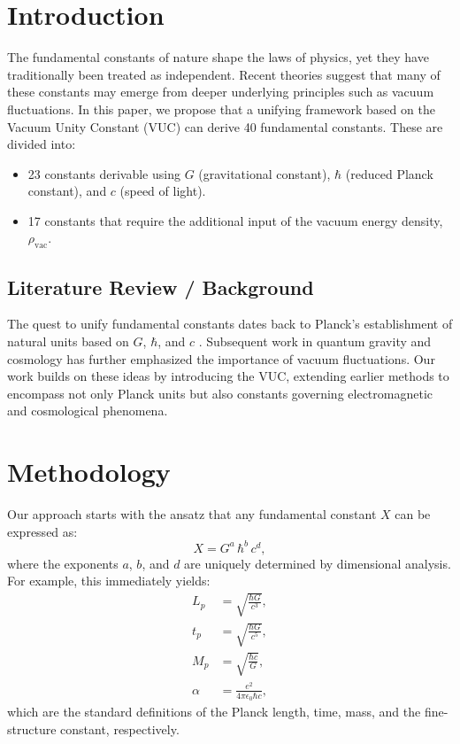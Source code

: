 \documentclass[12pt]{article}
\begin{document}
\section{Introduction}
The fundamental constants of nature shape the laws of physics, yet they have traditionally been treated as independent. Recent theories suggest that many of these constants may emerge from deeper underlying principles such as vacuum fluctuations. In this paper, we propose that a unifying framework based on the Vacuum Unity Constant (VUC) can derive 40 fundamental constants. These are divided into:
\begin{itemize}
    \item 23 constants derivable using \(G\) (gravitational constant), \(\hbar\) (reduced Planck constant), and \(c\) (speed of light).
    \item 17 constants that require the additional input of the vacuum energy density, \(\rho_{\text{vac}}\).
\end{itemize}

\subsection*{Literature Review / Background}
The quest to unify fundamental constants dates back to Planck's establishment of natural units based on \(G\), \(\hbar\), and \(c\) \cite{Planck1900}. Subsequent work in quantum gravity and cosmology \cite{Rovelli1998,Smolin2001} has further emphasized the importance of vacuum fluctuations. Our work builds on these ideas by introducing the VUC, extending earlier methods to encompass not only Planck units but also constants governing electromagnetic and cosmological phenomena.

\section{Methodology}
Our approach starts with the ansatz that any fundamental constant \(X\) can be expressed as:
\[
X = G^a\, \hbar^b\, c^d,
\]
where the exponents \(a\), \(b\), and \(d\) are uniquely determined by dimensional analysis. For example, this immediately yields:
\begin{align}
    L_p &= \sqrt{\frac{\hbar G}{c^3}}, \label{eq:planck_length}\\[1mm]
    t_p &= \sqrt{\frac{\hbar G}{c^5}}, \label{eq:planck_time}\\[1mm]
    M_p &= \sqrt{\frac{\hbar c}{G}}, \label{eq:planck_mass}\\[1mm]
    \alpha &= \frac{e^2}{4 \pi \epsilon_0 \hbar c}, \label{eq:alpha}
\end{align}
which are the standard definitions of the Planck length, time, mass, and the fine-structure constant, respectively.
\end{document}
